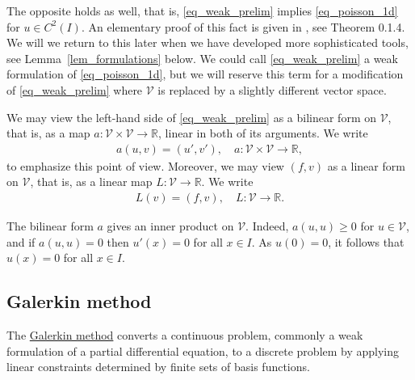 \documentclass[12pt,oneside,final]{amsart}
\def\R{\mathbb R}
\begin{document}
The opposite holds as well, that is, \eqref{eq_weak_prelim} implies \eqref{eq_poisson_1d} for $u \in C^2(I)$.
An elementary proof of this fact is given in \cite{BS}, see Theorem 0.1.4. We will we return to this later when we have developed more sophisticated tools, see Lemma~\ref{lem_formulations} below.
We could call \eqref{eq_weak_prelim} a weak formulation of \eqref{eq_poisson_1d}, but we will reserve this term for a modification of \eqref{eq_weak_prelim} where $\mathcal V$ is replaced by a slightly different vector space.  

We may view the left-hand side of \eqref{eq_weak_prelim} as a bilinear form on $\mathcal V$, that is, as a map $a: \mathcal V \times \mathcal V \to \R$, linear in both of its arguments.
We write  
    \begin{align}\label{def_a}
a(u, v) = (u', v'), \quad a : \mathcal V \times \mathcal V \to \mathbb R,
    \end{align}
to emphasize this point of view.   
Moreover, we may view $(f, v)$ as a linear form on $\mathcal V$, that is, as a linear map $L : \mathcal V \to \R$. We write 
    \begin{align}\label{def_L}
L(v) = (f,v), \quad L : \mathcal V \to \R.
    \end{align}

The bilinear form $a$ gives an inner product on $\mathcal V$. Indeed, $a(u,u) \ge 0$ for $u \in \mathcal V$, and if $a(u,u) = 0$ then $u'(x) = 0$ for all $x \in I$.
As $u(0) = 0$, it follows that $u(x) = 0$ for all $x \in I$.

\subsection{Galerkin method}

The \href{https://en.wikipedia.org/wiki/Galerkin_method}{Galerkin method} converts a continuous problem, commonly a weak formulation of a partial differential equation, to a discrete problem by applying linear constraints determined by finite sets of basis functions.
\end{document}
